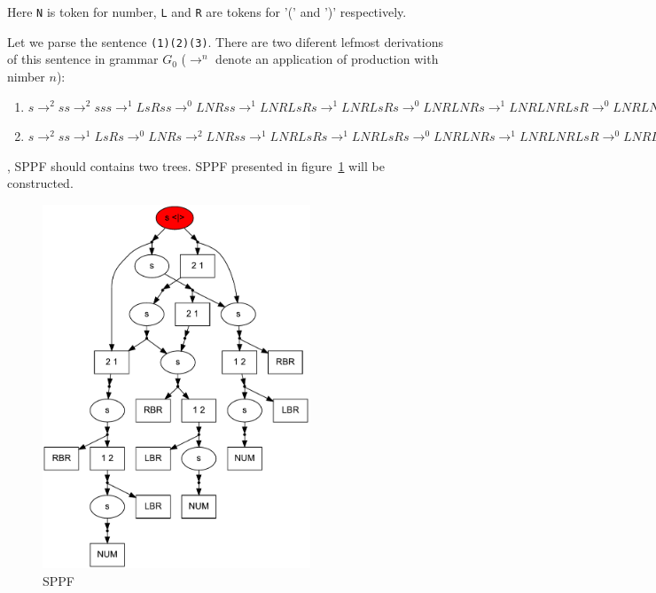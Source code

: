 \documentclass{sig-alternate} %
\begin{document}
Here \verb|N| is token for number, \verb|L| and \verb|R| are tokens for '(' and ')'  respectively.

Let we parse the sentence \verb|(1)(2)(3)|. There are two diferent lefmost derivations of this sentence in grammar $G_0$ ($\rightarrow ^ n$ denote an application of production with nimber $n$): 
\begin{enumerate} 
    \item $s \rightarrow ^ 2 s s \rightarrow ^ 2 s s s \rightarrow ^ 1 L s R s s \rightarrow ^ 0 L N R s s \rightarrow ^ 1 
    L N R L s R s \rightarrow ^ 1 L N R L s R s \rightarrow ^ 0 L N R L N R s \rightarrow ^ 1 L N R L N R L s R \rightarrow ^ 0 L N R L N R L N R$
    \item $s \rightarrow ^ 2 s s \rightarrow ^ 1 L s R s  \rightarrow ^ 0 L N R s \rightarrow ^ 2 L N R s s  \rightarrow ^ 1 
    L N R L s R s \rightarrow ^ 1 L N R L s R s \rightarrow ^ 0 L N R L N R s \rightarrow ^ 1 L N R L N R L s R \rightarrow ^ 0 L N R L N R L N R$
\end{enumerate}
    , SPPF should contains two trees. SPPF presented in figure~\ref{sppfSample} will be constructed.


\begin{figure}[h]
    \begin{center}
        \includegraphics[width=8cm]{dot/Brackets.pdf}
        \caption{SPPF}
        \label{sppfSample}        
    \end{center}
\end{figure}
\end{document}
